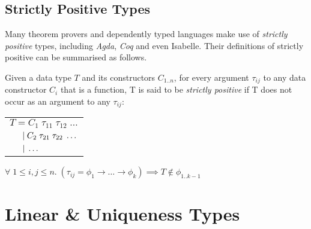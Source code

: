 \subsection{Strictly Positive Types}

Many theorem provers and dependently typed languages make use of \textit{strictly positive} types, including 
\textit{Agda}\citep{AgdaStrictlyPositive}, \textit{Coq}\citep{CoqStrictlyPositive} and even
Isabelle\citep{IsabelleStrictlyPositive}. Their definitions of strictly positive can be summarised as follows.

\theoremstyle{definition}
\begin{definition}
Given a data type $T$ and its constructors $C_{1..n}$, for every argument $\tau_{ij}$
to any data constructor $C_i$ that is a function, T is said to be \textit{strictly positive} if 
T does not occur as an argument to any $\tau_{ij}$:

\label{def:sp}
\begin{center}
\begin{tabular}{l}
$T = C_1\; \tau_{11} \; \tau_{12} \; \dots$ \\
$\hspace{1.5em} \vert\; C_2\; \tau_{21} \; \tau_{22} \; \dots$ \\
$\hspace{1.5em} \vert\; \dots$ \\
\end{tabular} 

$\forall\; 1 \leq i,j \leq n.\;
 (\tau_{ij} = \phi_{1} \rightarrow \dots \rightarrow \phi_{k})
 \implies T \notin \phi_{1..k-1}$
\end{center}
\end{definition}


\section{Linear \& Uniqueness Types}

